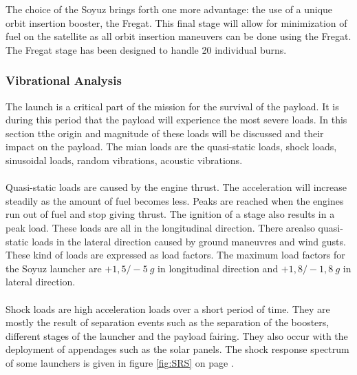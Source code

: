The choice of the Soyuz brings forth one more advantage: the use of a unique orbit insertion booster, the Fregat. This final stage will allow for minimization of fuel on the satellite as all orbit insertion maneuvers can be done using the Fregat. The Fregat stage has been designed to handle 20 individual burns.

\subsubsection{Vibrational Analysis}
\label{frLVCA}

The launch is a critical part of the mission for the survival of the payload. It is during this period that the payload will experience the most severe loads.
In this section tthe origin and magnitude of these loads will be discussed and their impact on the payload. The mian loads are the quasi-static loads, shock loads, sinusoidal loads, random vibrations, acoustic vibrations.
\\ \\
Quasi-static loads are caused by the engine thrust. The acceleration will increase steadily as the amount of fuel becomes less. Peaks are reached when the engines run out of fuel and stop giving thrust. The ignition of a stage also results in a peak load. These loads are all in the longitudinal direction. There arealso quasi-static loads in the lateral direction caused by ground maneuvres and wind gusts. These kind of loads are expressed as load factors. The maximum load factors for the Soyuz launcher are $+1,5/-5\ g$ in longitudinal direction and $+1,8/-1,8\ g$ in lateral direction.
\\ \\
Shock loads are high acceleration loads over a short period of time. They are mostly the result of separation events such as the separation of the boosters, different stages of the launcher and the payload fairing. They also occur with the deployment of appendages such as the solar panels. The shock response spectrum of some launchers is given in figure \ref{fig:SRS} on page \pageref{fig:SRS}.


